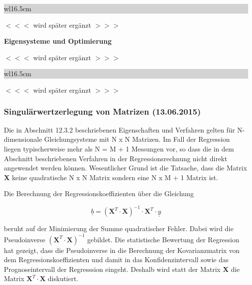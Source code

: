 \noindent
\colorbox{lightgray}{%
%
\renewcommand\arraystretch{0.6}%
\begin{tabular}{ wl{16.5cm} }
{\selectfont
{}}
\end{tabular}%
}\medskip

\noindent $<<<$ wird sp\"{a}ter erg\"{a}nzt $>>>$\bigskip

\selectfont
\noindent\textbf{Eigensysteme und Optimierung} \smallskip

\noindent $<<<$ wird sp\"{a}ter erg\"{a}nzt $>>>$\bigskip

\noindent
\colorbox{lightgray}{%
%
\renewcommand\arraystretch{0.6}%
\begin{tabular}{ wl{16.5cm} }
{\selectfont
{}}
\end{tabular}%
}\medskip

\noindent $<<<$ wird sp\"{a}ter erg\"{a}nzt $>>>$

\clearpage

\subsubsection{Singul\"{a}rwertzerlegung von Matrizen (13.06.2015)}

\noindent Die in Abschnitt 12.3.2 beschriebenen Eigenschaften und Verfahren gelten f\"{u}r N-dimensionale Gleichungsysteme mit N x N Matrizen. Im Fall der Regression liegen typischerweise mehr als N = M + 1 Messungen vor, so dass die in dem Abschnitt beschriebenen Verfahren in der Regressionsrechnung nicht direkt angewendet werden k\"{o}nnen. Wesentlicher Grund ist die Tatsache, dass die Matrix \textbf{X} keine quadratische N x N Matrix sondern eine N x M + 1 Matrix ist.\newline

\noindent Die Berechnung der Regressionskoeffizienten \"{u}ber die Gleichung

\begin{equation}\label{eq:thirteenonehundredthirtyone}
\underline{b}=\left(\textbf{X}^{T} \cdot \textbf{X}\right)^{-1} \cdot \textbf{X}^{T} \cdot \underline{y}
\end{equation}

\noindent beruht auf der Minimierung der Summe quadratischer Fehler. Dabei wird die Pseudoinverse $(\textbf{X}^{T}\cdot \textbf{X})^{-1}$ gebildet. Die statistische Bewertung der Regression hat gezeigt, dass die Pseudoinverse in die Berechnung der Kovarianzmatrix von dem Regressionskoeffizienten  und damit in das Konfidenzintervall sowie das Prognoseintervall der Regresssion eingeht. Deshalb wird statt der Matrix \textbf{X} die Matrix $\textbf{X}^{T}\cdot \textbf{X}$ diskutiert.\bigskip

